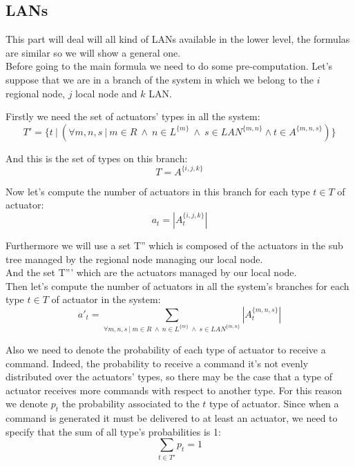 \documentclass[11pt]{article}
\begin{document}


\subsection{LANs}
This part will deal will all kind of LANs available in the lower level, the formulas are similar so we will show a general one.\\
Before going to the main formula we need to do some pre-computation.
Let's suppose that we are in a branch of the system in which we belong to the $i$ regional node, $j$ local node and $k$ LAN.

Firstly we need the set of actuators' types in all the system:
\begin{equation}
    T' = \{ t \ | \ (\forall m,n,s \ | \ m \in R \ \land \ n \in L^{\{m\}} \ \land \ s \in LAN^{\{m, n\}} \land t \in A^{\{m,n,s\}}) \}
\end{equation}


And this is the set of types on this branch:
\begin{equation}
    T = A^{\{i, j, k\}}
\end{equation}

Now let's compute the number of actuators in this branch for each type $t \in T$ of actuator:
\begin{equation}
    a_{t} = | A^{\{i, j, k\}}_{t} |
\end{equation}

Furthermore we will use a set T'' which is composed of the actuators in the sub tree managed by the regional node managing our local node.\\
And the set T''' which are the actuators managed by our local node.\\


Then let's compute the number of actuators in all the system's branches for each type $t \in T$ of actuator in the system:
\begin{equation}
    a'_{t} = \sum_{\forall m,n,s \ | \ m \in R \ \land \ n \in L^{\{m\}} \ \land \ s \in LAN^{\{m, n\}}}{ |A^{\{m, n, s\}}_{t}| }
\end{equation}


Also we need to denote the probability of each type of actuator to receive a command. Indeed, the probability to receive a command it's not evenly distributed over the actuators' types, so there may be the case that a type of actuator receives more commands with respect to another type.
For this reason we denote $p_t$ the probability associated to the $t$ type of actuator.
Since when a command is generated it must be delivered to at least an actuator, we need to specify that the sum of all type's probabilities is 1:
\begin{equation}
    \sum_{t \in T'}{p_t} = 1
\end{equation}
\end{document}
